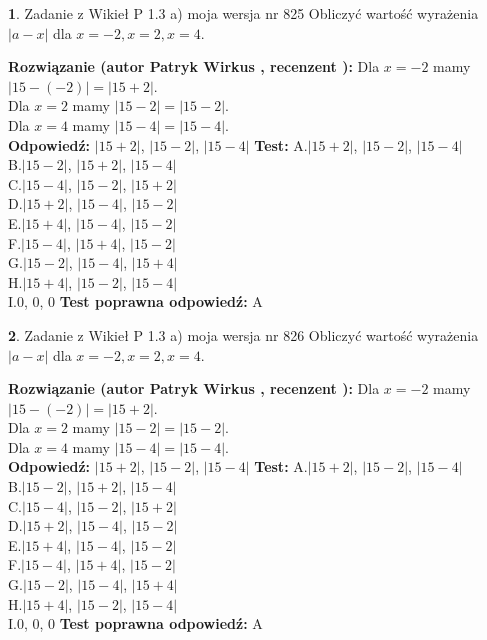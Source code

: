\documentclass[12pt, a4paper]{article}
\theoremstyle{definition} %
\newtheorem{zad}{}
\newcommand{\zadStart}[1]{\begin{zad}#1\newline}
\newcommand{\zadStop}{\end{zad}}
\newcommand{\rozwStart}[2]{\noindent \textbf{Rozwiązanie (autor #1 , recenzent #2): }\newline}
\newcommand{\rozwStop}{\newline}
\newcommand{\odpStart}{\noindent \textbf{Odpowiedź:}\newline}
\newcommand{\odpStop}{\newline}
\newcommand{\testStart}{\noindent \textbf{Test:}\newline}
\newcommand{\testStop}{\newline}
\newcommand{\kluczStart}{\noindent \textbf{Test poprawna odpowiedź:}\newline}
\newcommand{\kluczStop}{\newline}
\begin{document}
\zadStart{Zadanie z Wikieł P 1.3 a) moja wersja nr 825}
Obliczyć wartość wyrażenia $|a - x|$ dla $x=-2,x=2,x=4$.
\zadStop
\rozwStart{Patryk Wirkus}{}
Dla $x = -2$ mamy $|15 - (-2)| = |15 + 2|$.\\
Dla $x = 2$ mamy $|15 - 2| = |15 - 2|$.\\
Dla $x = 4$ mamy $|15 - 4| = |15 - 4|$.\\
\rozwStop
\odpStart
$|15 + 2|$, $|15 - 2|$, $|15 - 4|$
\odpStop
\testStart
A.$|15 + 2|$, $|15 - 2|$, $|15 - 4|$\\
B.$|15 - 2|$, $|15 + 2|$, $|15 - 4|$\\
C.$|15 - 4|$, $|15 - 2|$, $|15 + 2|$\\
D.$|15 + 2|$, $|15 - 4|$, $|15 - 2|$\\
E.$|15 + 4|$, $|15 - 4|$, $|15 - 2|$\\
F.$|15 - 4|$, $|15 + 4|$, $|15 - 2|$\\
G.$|15 - 2|$, $|15 - 4|$, $|15 + 4|$\\
H.$|15 + 4|$, $|15 - 2|$, $|15 - 4|$\\
I.$0$, $0$, $0$
\testStop
\kluczStart
A
\kluczStop



\zadStart{Zadanie z Wikieł P 1.3 a) moja wersja nr 826}
Obliczyć wartość wyrażenia $|a - x|$ dla $x=-2,x=2,x=4$.
\zadStop
\rozwStart{Patryk Wirkus}{}
Dla $x = -2$ mamy $|15 - (-2)| = |15 + 2|$.\\
Dla $x = 2$ mamy $|15 - 2| = |15 - 2|$.\\
Dla $x = 4$ mamy $|15 - 4| = |15 - 4|$.\\
\rozwStop
\odpStart
$|15 + 2|$, $|15 - 2|$, $|15 - 4|$
\odpStop
\testStart
A.$|15 + 2|$, $|15 - 2|$, $|15 - 4|$\\
B.$|15 - 2|$, $|15 + 2|$, $|15 - 4|$\\
C.$|15 - 4|$, $|15 - 2|$, $|15 + 2|$\\
D.$|15 + 2|$, $|15 - 4|$, $|15 - 2|$\\
E.$|15 + 4|$, $|15 - 4|$, $|15 - 2|$\\
F.$|15 - 4|$, $|15 + 4|$, $|15 - 2|$\\
G.$|15 - 2|$, $|15 - 4|$, $|15 + 4|$\\
H.$|15 + 4|$, $|15 - 2|$, $|15 - 4|$\\
I.$0$, $0$, $0$
\testStop
\kluczStart
A
\kluczStop
\end{document}
